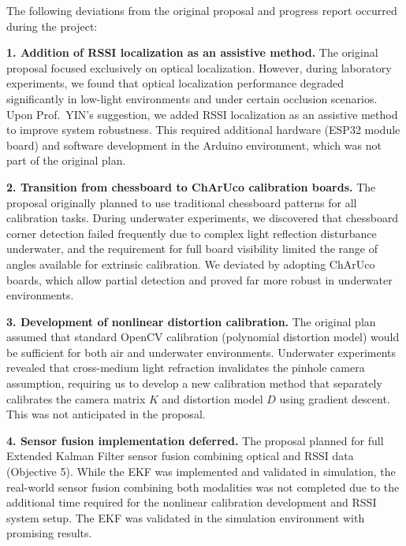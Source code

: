 \documentclass[11pt]{article}
\begin{document}
    \begin{flushleft}
    The following deviations from the original proposal and progress report occurred during the project:

    \textbf{1. Addition of RSSI localization as an assistive method.} The original proposal focused exclusively on optical localization. However, during laboratory experiments, we found that optical localization performance degraded significantly in low-light environments and under certain occlusion scenarios. Upon Prof.\ YIN's suggestion, we added RSSI localization as an assistive method to improve system robustness. This required additional hardware (ESP32 module board) and software development in the Arduino environment, which was not part of the original plan.

    \textbf{2. Transition from chessboard to ChArUco calibration boards.} The proposal originally planned to use traditional chessboard patterns for all calibration tasks. During underwater experiments, we discovered that chessboard corner detection failed frequently due to complex light reflection disturbance underwater, and the requirement for full board visibility limited the range of angles available for extrinsic calibration. We deviated by adopting ChArUco boards, which allow partial detection and proved far more robust in underwater environments.

    \textbf{3. Development of nonlinear distortion calibration.} The original plan assumed that standard OpenCV calibration (polynomial distortion model) would be sufficient for both air and underwater environments. Underwater experiments revealed that cross-medium light refraction invalidates the pinhole camera assumption, requiring us to develop a new calibration method that separately calibrates the camera matrix $K$ and distortion model $D$ using gradient descent. This was not anticipated in the proposal.

    \textbf{4. Sensor fusion implementation deferred.} The proposal planned for full Extended Kalman Filter sensor fusion combining optical and RSSI data (Objective 5). While the EKF was implemented and validated in simulation, the real-world sensor fusion combining both modalities was not completed due to the additional time required for the nonlinear calibration development and RSSI system setup. The EKF was validated in the simulation environment with promising results.
    \end{flushleft}
    \newpage
\end{document}
